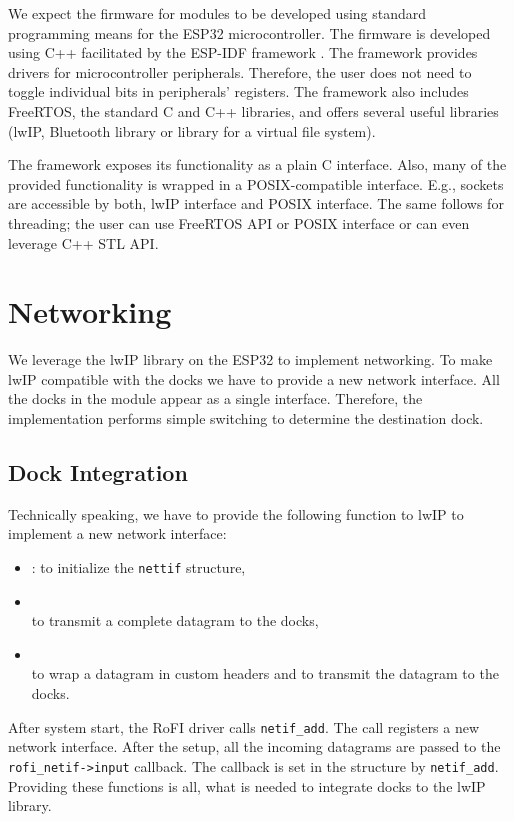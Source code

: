 We expect the firmware for modules to be developed using standard programming
means for the ESP32 microcontroller. The firmware is developed using C++
facilitated by the ESP-IDF framework \cite{noauthor_esp-idf_nodate}. The
framework provides drivers for microcontroller peripherals. Therefore, the user
does not need to toggle individual bits in peripherals' registers. The framework
also includes FreeRTOS, the standard C and C++ libraries, and offers several
useful libraries (lwIP, Bluetooth library or library for a virtual file
system).

The framework exposes its functionality as a plain C interface. Also, many of
the provided functionality is wrapped in a POSIX-compatible interface. E.g.,
sockets are accessible by both, lwIP interface and POSIX interface. The same
follows for threading; the user can use FreeRTOS API or POSIX interface or can
even leverage C++ STL API.

\section{Networking} \label{sec:networking}

We leverage the lwIP library on the ESP32 to implement networking. To make lwIP
compatible with the docks we have to provide a new network interface.
All the docks in the module appear as a single interface. Therefore, the
implementation performs simple switching to determine the destination dock.

\subsection{Dock Integration}

Technically speaking, we have to provide the following function to lwIP to
implement a new network interface:
\begingroup
\setlength{\rightskip}{0pt plus 1 fil}
\begin{itemize}
    \item {}:
    to initialize the \texttt{nettif} structure,
    \item {} \\
    to transmit a complete datagram to the docks,
    \item {} \\ 
    to wrap a datagram in custom headers and to transmit the datagram to the
    docks.
\end{itemize}
\endgroup
After system start, the RoFI driver calls \texttt{netif\_add}. The call
registers a new network interface. After the setup, all the incoming datagrams
are passed to the \texttt{rofi\_netif->input} callback. The callback is set in
the structure by \texttt{netif\_add}. Providing these functions is all, what is
needed to integrate docks to the lwIP library.

